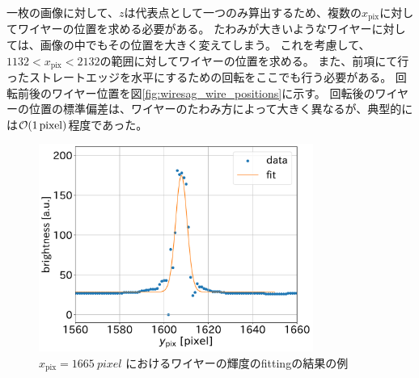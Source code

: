 \documentclass[../../main.tex]{subfiles}
\begin{document}
一枚の画像に対して、$z$は代表点として一つのみ算出するため、複数の$x_{\mathrm{pix}}$に対してワイヤーの位置を求める必要がある。
たわみが大きいようなワイヤーに対しては、画像の中でもその位置を大きく変えてしまう。
これを考慮して、$1132 < x_{\mathrm{pix}} < 2132$の範囲に対してワイヤーの位置を求める。
また、前項にて行ったストレートエッジを水平にするための回転をここでも行う必要がある。
回転前後のワイヤー位置を図\ref{fig:wiresag_wire_positions}に示す。
回転後のワイヤーの位置の標準偏差は、ワイヤーのたわみ方によって大きく異なるが、典型的には$\order{\SI{1}{pixel}}$程度であった。
\begin{figure}[H]
    \centering
    \includegraphics[width=0.8\textwidth]{wiresag/wiresag_wire_fit.pdf}
    \caption{$x_{\mathrm{pix}}=\SI{1665}{pixel}$ におけるワイヤーの輝度のfittingの結果の例}
    \label{fig:wiresag_wire_fit}
\end{figure}
\end{document}

